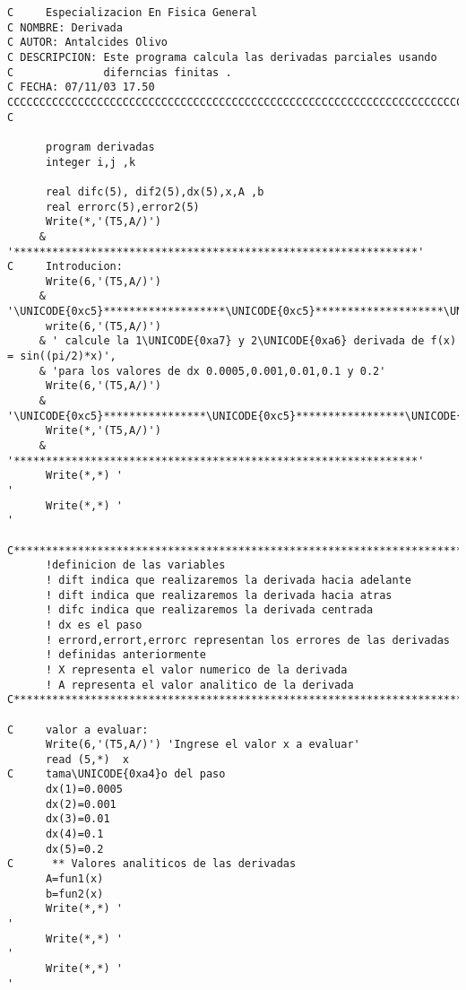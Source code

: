 \documentclass{article}
\begin{document}
\begin{verbatim}
C     Especializacion En Fisica General
C NOMBRE: Derivada
C AUTOR: Antalcides Olivo
C DESCRIPCION: Este programa calcula las derivadas parciales usando
C              diferncias finitas .
C FECHA: 07/11/03 17.50
CCCCCCCCCCCCCCCCCCCCCCCCCCCCCCCCCCCCCCCCCCCCCCCCCCCCCCCCCCCCCCCCCCCCCCCC
C
 
      program derivadas
      integer i,j ,k
 
      real difc(5), dif2(5),dx(5),x,A ,b
      real errorc(5),error2(5)
      Write(*,'(T5,A/)')
     & '***************************************************************'
C     Introducion:
      Write(6,'(T5,A/)')
     & '\UNICODE{0xc5}*******************\UNICODE{0xc5}********************\UNICODE{0xc5}********************\UNICODE{0xc5}'
      write(6,'(T5,A/)')
     & ' calcule la 1\UNICODE{0xa7} y 2\UNICODE{0xa6} derivada de f(x) = sin((pi/2)*x)',
     & 'para los valores de dx 0.0005,0.001,0.01,0.1 y 0.2'
      Write(6,'(T5,A/)')
     & '\UNICODE{0xc5}****************\UNICODE{0xc5}*****************\UNICODE{0xc5}**************************\UNICODE{0xc5}'
      Write(*,'(T5,A/)')
     & '***************************************************************'
      Write(*,*) '                                                     '
      Write(*,*) '                                                     '
 
C**********************************************************************
      !definicion de las variables
      ! dift indica que realizaremos la derivada hacia adelante
      ! dift indica que realizaremos la derivada hacia atras
      ! difc indica que realizaremos la derivada centrada
      ! dx es el paso
      ! errord,errort,errorc representan los errores de las derivadas
      ! definidas anteriormente
      ! X representa el valor numerico de la derivada
      ! A representa el valor analitico de la derivada
C***********************************************************************
 
C     valor a evaluar:
      Write(6,'(T5,A/)') 'Ingrese el valor x a evaluar'
      read (5,*)  x
C     tama\UNICODE{0xa4}o del paso
      dx(1)=0.0005
      dx(2)=0.001
      dx(3)=0.01
      dx(4)=0.1
      dx(5)=0.2
C      ** Valores analiticos de las derivadas
      A=fun1(x)
      b=fun2(x)
      Write(*,*) '                                                     '
      Write(*,*) '                                                     '
      Write(*,*) '                                                     '
 

\end{verbatim}
\end{document}
